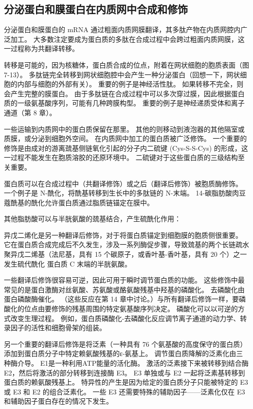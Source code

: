 \subsection{分泌蛋白和膜蛋白在内质网中合成和修饰}
分泌蛋白和膜蛋白的 mRNA 通过粗面内质网膜翻译，其多肽产物在内质网腔内广泛加工。 大多数注定要成为蛋白质的多肽在合成过程中会跨过粗面内质网膜，这一过程称为共翻译转移。

转移是可能的，因为核糖体，蛋白质合成的位点，附着在网状细胞的胞质表面（图 7-13）。 多肽链完全转移到网状细胞腔中会产生一种分泌蛋白（回想一下，网状细胞的内部与细胞的外部有关）。 重要的例子是神经活性肽。 如果转移不完全，则会产生完整的膜蛋白。 由于多肽链在合成过程中可以多次穿过膜，因此根据蛋白质的一级氨基酸序列，可能有几种跨膜构型。 重要的例子是神经递质受体和离子通道（第 8 章）。

一些运输到内质网中的蛋白质保留在那里。 其他的则移动到液泡器的其他隔室或质膜，或分泌到细胞外空间。 在内质网中加工的蛋白质被广泛修饰。 一个重要的修饰是由成对的游离巯基侧链氧化引起的分子内二硫键 (Cys-S-S-Cys) 的形成，这一过程不能发生在胞质溶胶的还原环境中。 二硫键对于这些蛋白质的三级结构至关重要。

蛋白质可以在合成过程中（共翻译修饰）或之后（翻译后修饰）被胞质酶修饰。 一个例子是 N-酰化，将酰基转移到生长中的多肽链的 N-末端。 14-碳脂肪酸肉豆蔻酰基的酰化允许蛋白质通过脂质链锚定在膜中。

其他脂肪酸可以与半胱氨酸的巯基结合，产生硫酰化作用：

异戊二烯化是另一种翻译后修饰，对于将蛋白质锚定到细胞膜的胞质侧很重要。 它在蛋白质合成完成后不久发生，涉及一系列酶促步骤，导致巯基的两个长链疏水聚异戊二烯基（法尼基，具有 15 个碳原子，或香叶基-香叶基，具有 20 个）之一发生硫代酰化 蛋白质 C 末端的半胱氨酸。

一些翻译后修饰很容易可逆，因此可用于瞬时调节蛋白质的功能。 这些修饰中最常见的是蛋白激酶对丝氨酸、苏氨酸或酪氨酸残基中羟基的磷酸化。 去磷酸化由蛋白磷酸酶催化。 （这些反应在第 14 章中讨论。）与所有翻译后修饰一样，要磷酸化的位点由要修饰的残基周围的特定氨基酸序列决定。 磷酸化可以以可逆的方式改变生理过程。 例如，蛋白质磷酸化-去磷酸化反应调节离子通道的动力学、转录因子的活性和细胞骨架的组装。

另一个重要的翻译后修饰是将泛素（一种具有 76 个氨基酸的高度保守的蛋白质）添加到蛋白质分子中特定赖氨酸残基的ε-氨基上。 调节蛋白质降解的泛素化由三种酶介导。 E1是一种利用ATP能量的活化酶。 激活的泛素接下来被转移到结合酶 E2，然后将激活的部分转移到连接酶 E3。 E3 单独或与 E2 一起将泛素基转移到蛋白质的赖氨酸残基上。 特异性的产生是因为给定的蛋白质分子只能被特定的 E3 或 E3 和 E2 的组合泛素化。 一些 E3 还需要特殊的辅助因子——泛素化仅在 E3 和辅助因子蛋白存在的情况下发生。

